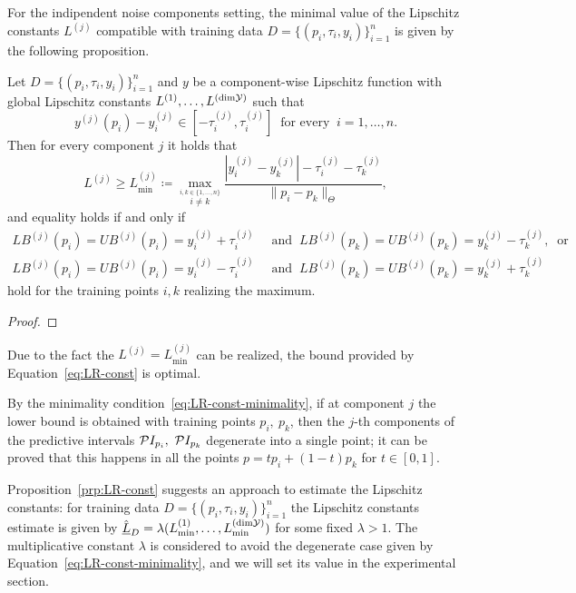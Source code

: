 For the indipendent noise components setting, the minimal value of the Lipschitz constants $L^{(j)}$ compatible with training data $D=\{ (p_i, \tau_i, y_i) \}_{i=1}^n$ is given by the following proposition.
\begin{prp} \label{prp:LR-const}
    Let $D=\{ (p_i, \tau_i, y_i) \}_{i=1}^n$ and $y$ be a component-wise Lipschitz function with global Lipschitz constants $L^{(1)},\dots, L^{(\text{dim}\mathcal Y)}$ such that 
    \[
        y^{(j)}(p_i) -y_i^{(j)} \in  [-\tau_i^{(j)},\tau_i^{(j)}] \ \text{ for every } \ i = 1, \dots, n.
    \]
    Then for every component $j$ it holds that
    \begin{equation}\label{eq:LR-const}
        L^{(j)} \geq L^{(j)}_{\min}\coloneq \max_{ \stackrel{i, k \in \{1, \dots, n\}}{i\neq k} } \frac{| y_i^{(j)} - y_k^{(j)} | - \tau_i^{(j)} - \tau_k^{(j)}}{\| p_i - p_k \|_\Theta},
    \end{equation}
    and equality holds if and only if
    \begin{equation}\label{eq:LR-const-minimality}
        \begin{aligned}
            LB^{(j)}(p_i) =UB^{(j)}(p_i) = y_i^{(j)} + \tau_i^{(j)}  \ &\text{ and }   \ LB^{(j)}(p_k) =UB^{(j)}(p_k) = y_k^{(j)} - \tau_k^{(j)}, \ \text{ or } \\
            LB^{(j)}(p_i) =UB^{(j)}(p_i) = y_i^{(j)} - \tau_i^{(j)}  \ &\text{ and }   \ LB^{(j)}(p_k) =UB^{(j)}(p_k) = y_k^{(j)} + \tau_k^{(j)}
        \end{aligned}
    \end{equation}
    hold for the training points $i,k$ realizing the maximum. 
\end{prp}
\begin{proof}
\end{proof}
\begin{rmk}
Due to the fact the $L^{(j)}=L^{(j)}_{\min}$ can be realized, the bound provided by Equation~\eqref{eq:LR-const} is optimal. 
\end{rmk}
\begin{rmk}
By the minimality condition~\eqref{eq:LR-const-minimality}, if at component $j$ the lower bound is obtained with training points $p_i, \ p_k$, then the $j$-th components of the predictive intervals $\mathcal PI_{p_i},\ \mathcal PI_{p_k}$ degenerate into a single point; it can be proved that this happens in all the points $p = t p_i + (1-t) p_k$ for $t \in [0,1]$. 
\end{rmk}

Proposition~\ref{prp:LR-const} suggests an approach to estimate the Lipschitz constants: for training data $D=\{ (p_i, \tau_i, y_i) \}_{i=1}^n$ the Lipschitz constants estimate is given by $\hat{\underline{L}}_D = \lambda ( L^{(1)}_{\min}, \dots, L^{(\text{dim}\mathcal Y)}_{\min})$ for some fixed $\lambda > 1$. 
The multiplicative constant $\lambda$ is considered to avoid the degenerate case given by Equation~\eqref{eq:LR-const-minimality}, and we will set its value in the experimental section.